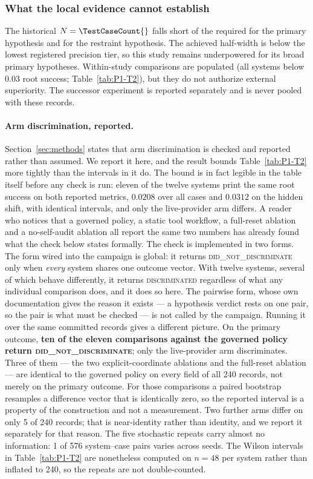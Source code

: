 \subsubsection{What the local evidence cannot establish}
The historical $N=\TestCaseCount{}$ falls short of the required
\RequiredNForHOne{} for the primary hypothesis and \RequiredNForHTwo{} for the
restraint hypothesis. The achieved half-width \AchievedHalfWidth{} is below the
lowest registered precision tier, so this study remains underpowered for its
broad primary hypotheses.
Within-study comparisons are populated (all systems below 0.03 root success;
Table~\ref{tab:P1-T2}), but they do not authorize external superiority. The
successor experiment is reported separately and is never pooled with these
records.

\paragraph{Arm discrimination, reported.}
Section~\ref{sec:methods} states that arm discrimination is checked and reported
rather than assumed. We report it here, and the result bounds Table~\ref{tab:P1-T2}
more tightly than the intervals in it do. The bound is in fact legible in the table
itself before any check is run: eleven of the twelve systems print the same root
success on both reported metrics, $0.0208$ over all cases and $0.0312$ on the hidden
shift, with identical intervals, and only the live-provider arm differs. A reader who
notices that a governed policy, a static tool workflow, a full-reset ablation and a
no-self-audit ablation all report the same two numbers has already found what the
check below states formally. The check is implemented in two forms.
The form wired into the campaign is global: it returns \textsc{did\_not\_discriminate}
only when \emph{every} system shares one outcome vector. With twelve systems, several
of which behave differently, it returns \textsc{discriminated} regardless of what any
individual comparison does, and it does so here. The pairwise form, whose own
documentation gives the reason it exists --- a hypothesis verdict rests on one pair,
so the pair is what must be checked --- is not called by the campaign. Running it over
the same committed records gives a different picture. On the primary outcome,
\textbf{ten of the eleven comparisons against the governed policy return
\textsc{did\_not\_discriminate}}; only the live-provider arm discriminates. Three of
them --- the two explicit-coordinate ablations and the full-reset ablation --- are
identical to the governed policy on every field of all 240 records, not merely on the
primary outcome. For those comparisons a paired bootstrap resamples a difference
vector that is identically zero, so the reported interval is a property of the
construction and not a measurement. Two further arms differ on only 5 of 240 records;
that is near-identity rather than identity, and we report it separately for that
reason. The five stochastic repeats carry almost no information: 1 of 576
system--case pairs varies across seeds. The Wilson intervals in
Table~\ref{tab:P1-T2} are nonetheless computed on $n=48$ per system rather than
inflated to 240, so the repeats are not double-counted.

